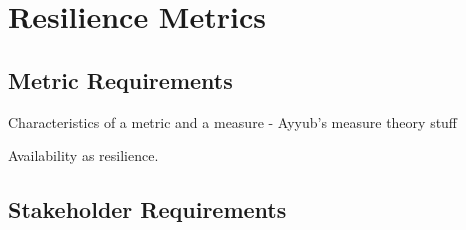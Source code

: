 
\renewcommand{\thechapter}{3}

\chapter{Resilience Metrics}

\section{Metric Requirements}
Characteristics of a metric and a measure - Ayyub's measure theory
stuff

Availability as resilience.


\cite{Ayyub2014a}

\section{Stakeholder Requirements}

